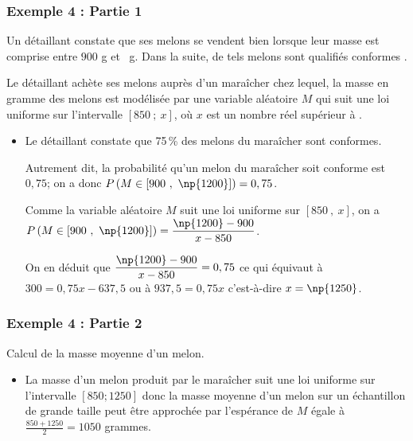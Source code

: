 \documentclass[xcolor=svgnames,t,final]{beamer}
\begin{document}
\begin{frame}

\frametitle{Exemple 4 : Partie 1}
\label{exemple4}

Un détaillant constate que ses melons se vendent bien lorsque leur masse est comprise entre $900$ g et
~g. Dans la suite, de tels melons sont qualifiés \og conformes \fg.

Le détaillant achète ses melons auprès d'un   maraîcher chez lequel, la masse en gramme  des melons est
 modélisée par une variable aléatoire $M$
qui suit une loi uniforme sur l'intervalle $[850~;~x]$, où $x$ est un nombre réel supérieur à .


\begin{itemize}

\pause \item Le détaillant constate que 75\,\% des melons du maraîcher sont conformes. %

Autrement dit, la probabilité qu'un melon du maraîcher soit conforme est $0,75$; on a donc $P\left ( M \in [ 900~,~\np{1200}] \right ) = 0,75$.

Comme la variable aléatoire $M$ suit une loi uniforme sur $[ 850~,~x ]$, on a\\
$P\left ( M \in [ 900~,~\np{1200}]  \right ) = \dfrac{\np{1200}-900}{x-850}$.

On en déduit que $\dfrac{\np{1200}-900}{x-850} = 0,75$ ce qui équivaut à
$300 = 0,75x - 637,5$ ou à $937,5 = 0,75x$ c'est-à-dire $x=\np{1250}$.

\end{itemize}

\end{frame}


\begin{frame}

\frametitle{Exemple 4 : Partie 2}


Calcul de la masse moyenne d'un melon.

\begin{itemize}

\pause \item La masse d'un melon produit par le maraîcher suit une loi uniforme sur l'intervalle $[850;1250]$ donc   la masse moyenne d'un melon sur un échantillon de grande taille peut être approchée par l'espérance de $M$ égale à $\frac{850+1250}{2}=1050$ grammes.

\end{itemize}



\end{frame}
\end{document}
